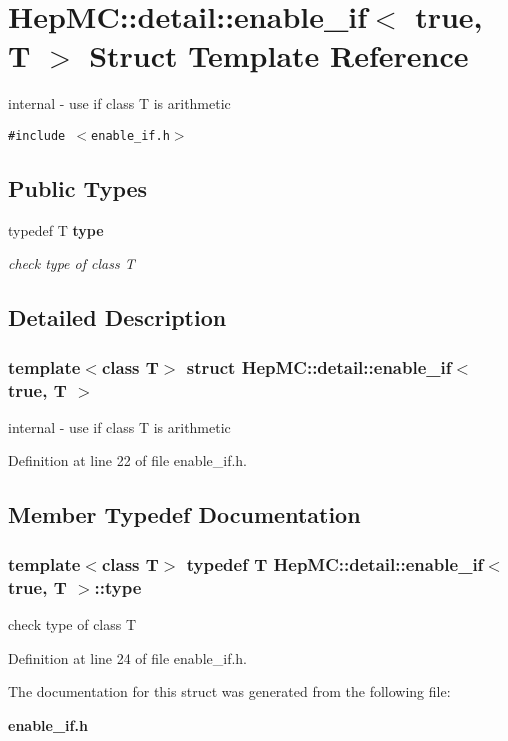 \section{Hep\-MC::detail::enable\_\-if$<$ true, T $>$ Struct Template Reference}
\label{structHepMC_1_1detail_1_1enable__if_3_01true_00_01T_01_4}
internal - use if class T is arithmetic  


{\tt \#include $<$enable\_\-if.h$>$}

\subsection*{Public Types}
\begin{CompactItemize}
\item 
typedef T {\bf type}
\begin{CompactList}\small\item\em check type of class T \item\end{CompactList}\end{CompactItemize}


\subsection{Detailed Description}
\subsubsection*{template$<$class T$>$ struct Hep\-MC::detail::enable\_\-if$<$ true, T $>$}

internal - use if class T is arithmetic 



Definition at line 22 of file enable\_\-if.h.

\subsection{Member Typedef Documentation}
\subsubsection{\setlength{\rightskip}{0pt plus 5cm}template$<$class T$>$ typedef T {\bf Hep\-MC::detail::enable\_\-if}$<$ true, T $>$::{\bf type}}\label{structHepMC_1_1detail_1_1enable__if_3_01true_00_01T_01_4_ee3292c5a6059382a70ea07ad0e461f2}


check type of class T 



Definition at line 24 of file enable\_\-if.h.

The documentation for this struct was generated from the following file:\begin{CompactItemize}
\item 
{\bf enable\_\-if.h}\end{CompactItemize}
